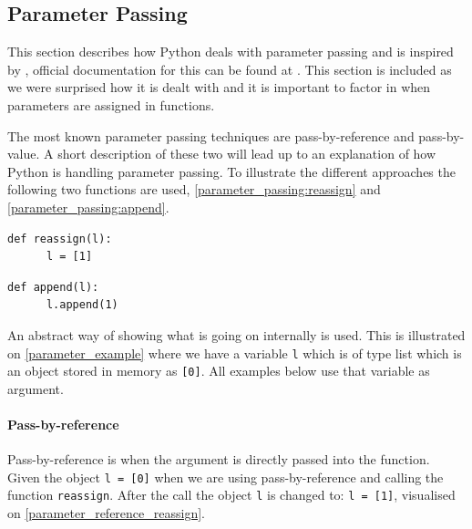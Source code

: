 \subsection{Parameter Passing}
This section describes how Python deals with parameter passing and is inspired by \citet{parameter_passing}, official documentation for this can be found at \citet{parameter_passing_official}.
This section is included as we were surprised how it is dealt with and it is important to factor in when parameters are assigned in functions.

The most known parameter passing techniques are pass-by-reference and pass-by-value.
A short description of these two will lead up to an explanation of how Python is handling parameter passing.
To illustrate the different approaches the following two functions are used, \cref{parameter_passing:reassign} and \cref{parameter_passing:append}.

\begin{lstlisting}[style=python, caption={Parameter passing: \texttt{reassign} function.}, label={parameter_passing:reassign}]
  def reassign(l):
      l = [1]
\end{lstlisting}

\begin{lstlisting}[style=python, caption={Parameter passing: \texttt{append} function.}, label={parameter_passing:append}]
  def append(l):
      l.append(1)
\end{lstlisting}

An abstract way of showing what is going on internally is used.
This is illustrated on \cref{parameter_example} where we have a variable \texttt{l} which is of type list which is an object stored in memory as \texttt{[0]}.
All examples below use that variable as argument.


\paragraph{Pass-by-reference}
Pass-by-reference is when the argument is directly passed into the function.
Given the object \texttt{l = [0]} when we are using pass-by-reference and calling the function \texttt{reassign}.
After the call the object \texttt{l} is changed to: \texttt{l = [1]}, visualised on \cref{parameter_reference_reassign}.


